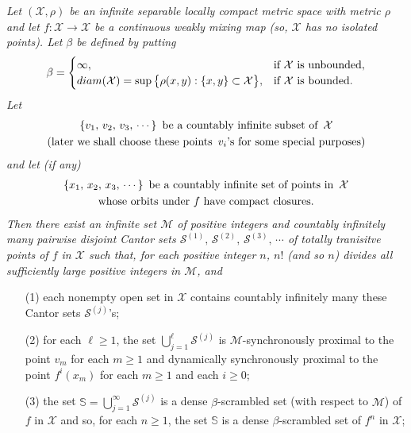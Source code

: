 \documentclass[12pt]{article}
\begin{document}
{\it Let $(\mathcal X, \rho)$ be an infinite separable locally compact metric space with metric $\rho$ and let $f : \mathcal X \rightarrow \mathcal X$ be a continuous weakly mixing map (so, $\mathcal X$ has no isolated points).  Let $\beta$ be defined by putting
$$
\beta =  \begin{cases}
               \infty, & \text{if $\mathcal X$ is unbounded}, \cr
               diam(\mathcal X) = \sup\big\{ \rho(x, y): \{ x, y \} \subset \mathcal X \big\}, & \text{if $\mathcal X$ is bounded}. \cr
       \end{cases}
$$
Let 
\begin{multline*}
$$
\{ v_1, \, v_2, \, v_3, \, \cdots \} \,\,\, \text{be a countably infinite subset of} \,\,\, \mathcal X \\ \text{(later we shall choose these points} \,\,\, v_i\text{'s for some special purposes)}
$$
\end{multline*} 
and let (if any)
\begin{multline*}
$$
\{ x_1, \, x_2, \, x_3, \, \cdots \} \,\,\, \text{be a countably infinite set of points in} \,\,\, \mathcal X \\
\text{whose orbits under} \,\, f \,\, \text{have compact closures}.
$$  
\end{multline*}
Then there exist an infinite set $\mathcal M$ of positive integers and countably infinitely many pairwise disjoint Cantor sets $\mathcal S^{(1)}, \, \mathcal S^{(2)}, \, \mathcal S^{(3)}, \, \cdots$ of totally tranisitve points of $f$ in $\mathcal X$ such that, for each positive integer $n$, $n !$ (and so $n$) divides all sufficiently large positive integers in $\mathcal M$, and
\begin{itemize}
\item[{\rm (1)}]
each nonempty open set in $\mathcal X$ contains countably infinitely many these Cantor sets $\mathcal S^{(j)}$'s;

\item[{\rm (2)}]
for each $\ell \ge 1$, the set $\bigcup_{j=1}^\ell \mathcal S^{(j)}$ is $\mathcal M$-synchronously proximal to the point $v_m$ for each $m \ge 1$ and dynamically synchronously proximal to the point $f^i(x_m)$ for each $m \ge 1$ and each $i \ge 0$;

\item[{\rm (3)}]
the set $\mathbb S = \bigcup_{j=1}^\infty \mathcal S^{(j)}$ is a dense $\beta$-scrambled set (with respect to $\mathcal M$) of $f$ in $\mathcal X$ and so, for each $n \ge 1$, the set $\mathbb S$ is a dense $\beta$-scrambled set of $f^n$ in $\mathcal X$;


\end{itemize}}
\end{document}
